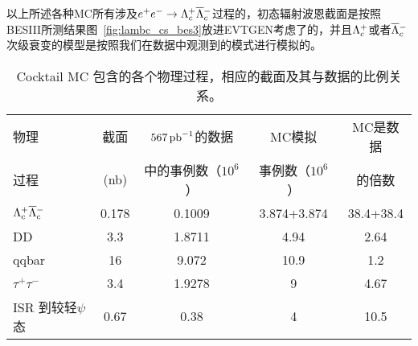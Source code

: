 以上所述各种MC所有涉及$e^+e^- \rightarrow \Lambda_{c}^{+}\overline{\Lambda}{}_{c}^{-}$过程的，初态辐射波恩截面是按照BESIII所测结果图~\ref{fig:lambc_cs_bes3}放进EVTGEN考虑了的，并且$\Lambda_{c}^{+}$或者$\overline{\Lambda}{}_{c}^{-}$次级衰变的模型是按照我们在数据中观测到的模式进行模拟的。
\begin{table}
\footnotesize
\caption{Cocktail MC 包含的各个物理过程，相应的截面及其与数据的比例关系。}
\centering
\begin{tabular}{l|c|c|c|c}
\hline \hline
物理  & 截面  & $567\,\rm{pb}^{-1}$的数据 & MC模拟 & MC是数据 \\ 
过程  & (nb)  & 中的事例数（$10^6$） & 事例数（$10^6$）  & 的倍数 \\ \hline
$\Lambda_{c}^{+}\overline{\Lambda}{}_{c}^{-}$ & 0.178\protect\footnotemark  & 0.1009  & 3.874+3.874  &  38.4+38.4  \\ \hline 
DD & 3.3  & 1.8711  & 4.94  &  2.64  \\ \hline 
qqbar & 16  & 9.072  & 10.9  &  1.2  \\ \hline 
$\tau^+\tau^-$ & 3.4  & 1.9278  & 9  &  4.67  \\ \hline 
ISR 到较轻$\psi$态 & 0.67  & 0.38  & 4  &  10.5  \\ \hline 
\hline
\end{tabular}
\label{tab:MCsample}
\end{table}


